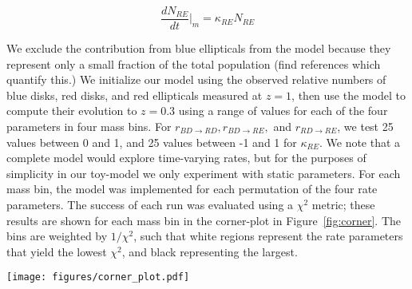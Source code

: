 \begin{equation}
\frac{dN_{RE}}{dt}\Big\rvert_{m} = \kappa_{RE} N_{RE}  
\label{eqn:RE}
\end{equation}

We exclude the contribution from blue ellipticals from the model because they represent only a small fraction of the total population (find references which quantify this.) We initialize our model using the observed relative numbers of blue disks, red disks, and red ellipticals measured at $z=1$, then use the model to compute their evolution to $z=0.3$ using a range of values for each of the four parameters in four mass bins. For $r_{BD \rightarrow RD}, r_{BD \rightarrow RE},$ and $r_{RD \rightarrow RE}$, we test 25 values between 0 and 1, and 25 values between -1 and 1 for $\kappa_{RE}$. We note that a complete model would explore time-varying rates, but for the purposes of simplicity in our toy-model we only experiment with static parameters. For each mass bin, the model was implemented for each permutation of the four rate parameters. The success of each run was evaluated using a $\chi^2$ metric; these results are shown for each mass bin in the corner-plot in Figure~\ref{fig:corner}. The bins are weighted by $1/\chi^2$, such that white regions represent the rate parameters that yield the lowest $\chi^2$, and black representing the largest.

\begin{figure*}
\centering
\texttt{[image: figures/corner\_plot.pdf]}
\caption{Results of the grid-search for the best-fit rate parameters $r_{BD \rightarrow RD}, r_{BD \rightarrow RE}, r_{RD \rightarrow RE}$, and $\kappa_{RE}$ for four mass bins. The units for all rate parameters is $\rm Gyr^{-1}$. 25 equally-spaced values were tested between (0,1) for each parameter, with the exception of $\kappa_{RE}$ which was tested for 25 values between (-1,1); these are represented by the 25 bins on each axis. Each bin is weighted by $1/\chi^2$, such that white regions correspond to parameters which produced the lowest $\chi^2$, and black representing the highest. There is a strong result in the dependence of $r_{BD \rightarrow RD}$ with mass, such that the fraction of blue disks which transition to red disks (ie, quench without disrupting the disk), increases for more massive galaxies. The other parameters are less constrained by this model; therefore a more complex semi-analytic model will be necessary for obtaining the precise values of these rates, and is the subject of future work.}
\label{fig:corner}
\end{figure*} 

